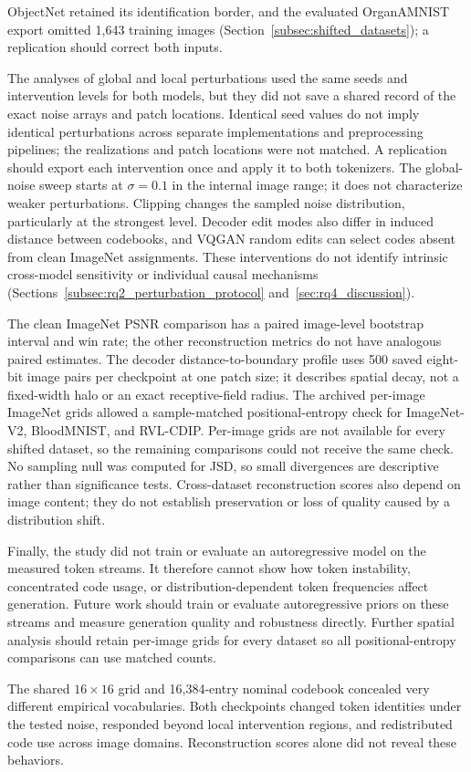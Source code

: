 ObjectNet retained its identification border, and the evaluated OrganAMNIST
export omitted 1{,}643 training images
(Section~\ref{subsec:shifted_datasets}); a replication should correct both
inputs.

The analyses of global and local perturbations used the same seeds and
intervention levels for both models, but they did not save a shared record of
the exact noise arrays and patch locations. Identical seed values do not imply
identical perturbations across separate implementations and preprocessing
pipelines; the realizations and patch locations were not matched. A replication
should export each intervention once and apply it to both tokenizers.
The global-noise sweep starts at $\sigma=0.1$ in the internal image range;
it does not characterize weaker perturbations. Clipping changes the sampled
noise distribution, particularly at the strongest level. Decoder edit modes
also differ in induced distance between codebooks, and VQGAN random edits can
select codes absent from clean ImageNet assignments. These interventions do
not identify intrinsic cross-model sensitivity or individual causal mechanisms
(Sections~\ref{subsec:rq2_perturbation_protocol} and~\ref{sec:rq4_discussion}).

The clean ImageNet PSNR comparison has a paired image-level bootstrap interval
and win rate; the other reconstruction metrics do not have analogous paired
estimates. The decoder distance-to-boundary profile uses 500 saved eight-bit
image pairs per checkpoint at one patch size; it describes spatial decay, not
a fixed-width halo or an exact receptive-field radius. The archived per-image
ImageNet grids allowed a sample-matched
positional-entropy check for ImageNet-V2, BloodMNIST, and RVL-CDIP. Per-image
grids are not available for every shifted dataset, so the remaining
comparisons could not receive the same check.
No sampling null was computed for JSD, so small divergences are descriptive
rather than significance tests. Cross-dataset reconstruction scores also
depend on image content; they do not establish preservation or loss of quality
caused by a distribution shift.

Finally, the study did not train or evaluate an autoregressive model on the
measured token streams. It therefore cannot show how token instability,
concentrated code usage, or distribution-dependent token frequencies affect
generation. Future work should train or evaluate autoregressive priors on these
streams and measure generation quality and robustness directly. Further
spatial analysis should retain per-image grids for every dataset so all
positional-entropy comparisons can use matched counts.

The shared $16\times16$ grid and 16{,}384-entry nominal codebook concealed very
different empirical vocabularies. Both checkpoints changed token identities
under the tested noise, responded beyond local intervention regions, and
redistributed code use across image domains. Reconstruction scores alone did
not reveal these behaviors.
